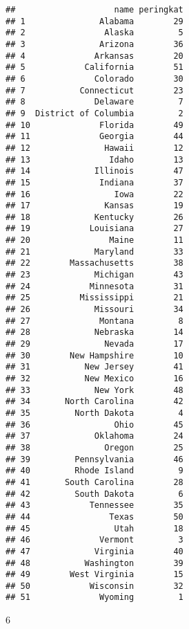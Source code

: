 \documentclass[
]{article}
\newenvironment{Shaded}{\begin{snugshade}}{\end{snugshade}}
\newcommand{\DataTypeTok}[1]{\textcolor[rgb]{0.13,0.29,0.53}{#1}}
\newcommand{\KeywordTok}[1]{\textcolor[rgb]{0.13,0.29,0.53}{\textbf{#1}}}
\newcommand{\NormalTok}[1]{#1}
\newcommand{\OperatorTok}[1]{\textcolor[rgb]{0.81,0.36,0.00}{\textbf{#1}}}
\newcommand{\StringTok}[1]{\textcolor[rgb]{0.31,0.60,0.02}{#1}}
\begin{document}
\begin{verbatim}
##                    name peringkat
## 1               Alabama        29
## 2                Alaska         5
## 3               Arizona        36
## 4              Arkansas        20
## 5            California        51
## 6              Colorado        30
## 7           Connecticut        23
## 8              Delaware         7
## 9  District of Columbia         2
## 10              Florida        49
## 11              Georgia        44
## 12               Hawaii        12
## 13                Idaho        13
## 14             Illinois        47
## 15              Indiana        37
## 16                 Iowa        22
## 17               Kansas        19
## 18             Kentucky        26
## 19            Louisiana        27
## 20                Maine        11
## 21             Maryland        33
## 22        Massachusetts        38
## 23             Michigan        43
## 24            Minnesota        31
## 25          Mississippi        21
## 26             Missouri        34
## 27              Montana         8
## 28             Nebraska        14
## 29               Nevada        17
## 30        New Hampshire        10
## 31           New Jersey        41
## 32           New Mexico        16
## 33             New York        48
## 34       North Carolina        42
## 35         North Dakota         4
## 36                 Ohio        45
## 37             Oklahoma        24
## 38               Oregon        25
## 39         Pennsylvania        46
## 40         Rhode Island         9
## 41       South Carolina        28
## 42         South Dakota         6
## 43            Tennessee        35
## 44                Texas        50
## 45                 Utah        18
## 46              Vermont         3
## 47             Virginia        40
## 48           Washington        39
## 49        West Virginia        15
## 50            Wisconsin        32
## 51              Wyoming         1
\end{verbatim}

6

\begin{Shaded}
\end{Shaded}
\end{document}
